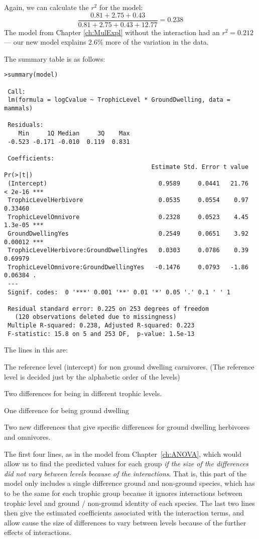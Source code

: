 Again, we can calculate the $r^2$ for the model: \[ \frac{0.81 + 2.75 + 
0.43}{0.81+2.75+0.43+12.77} = 0.238 \] The model from Chapter 
\ref{ch:MulExpl} without the interaction had an $r^2 = 0.212$ --- our 
new model explains 2.6\% more of the variation in the data.

The summary table is as follows:

 \begin{lstlisting}
>summary(model)
 
 Call:
 lm(formula = logCvalue ~ TrophicLevel * GroundDwelling, data = mammals)
 
 Residuals:
    Min     1Q Median     3Q    Max 
 -0.523 -0.171 -0.010  0.119  0.831 
 
 Coefficients:
                                         Estimate Std. Error t value Pr(>|t|)    
 (Intercept)                               0.9589     0.0441   21.76  < 2e-16 ***
 TrophicLevelHerbivore                     0.0535     0.0554    0.97  0.33460    
 TrophicLevelOmnivore                      0.2328     0.0523    4.45  1.3e-05 ***
 GroundDwellingYes                         0.2549     0.0651    3.92  0.00012 ***
 TrophicLevelHerbivore:GroundDwellingYes   0.0303     0.0786    0.39  0.69979    
 TrophicLevelOmnivore:GroundDwellingYes   -0.1476     0.0793   -1.86  0.06384 .  
 ---
 Signif. codes:  0 '***' 0.001 '**' 0.01 '*' 0.05 '.' 0.1 ' ' 1 
 
 Residual standard error: 0.225 on 253 degrees of freedom
   (120 observations deleted due to missingness)
 Multiple R-squared: 0.238,	Adjusted R-squared: 0.223 
 F-statistic: 15.8 on 5 and 253 DF,  p-value: 1.5e-13 
\end{lstlisting}

The lines in this are:
\begin{compactitem}
	\item The reference level (intercept) for non ground dwelling 
	carnivores. (The reference level is decided just by the alphabetic 
	order of the levels)
	\item Two differences for being in different trophic levels.
	\item One difference for being ground dwelling
	\item Two new differences that give specific differences for ground 
	dwelling herbivores and omnivores.
\end{compactitem}

The first four lines, as in the model from Chapter~\ref{ch:ANOVA}, 
which would allow us to find the predicted values for each group {\it if the size of the differences did not vary between levels because of the interactions}. That is, this part of the model only includes a single difference ground and non-ground species, which has to be the same for each trophic group because it  ignores interactions between trophic level and ground / non-ground
identity of each species. The last two lines then give the estimated coefficients associated with the interaction terms, and allow cause the size of differences to vary between levels because of the further effects of interactions.

